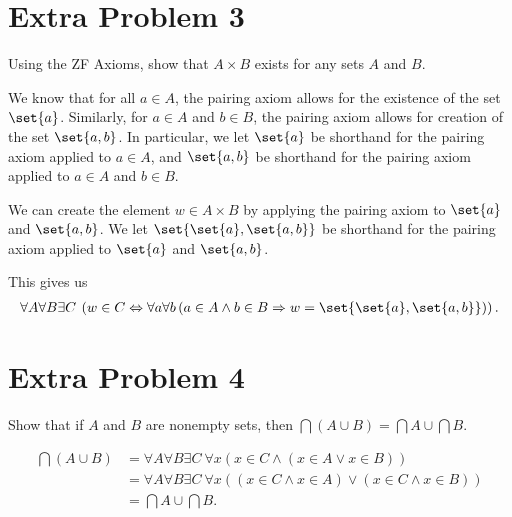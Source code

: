 \documentclass[10pt]{mypackage}
\begin{document}
\section{Extra Problem 3}%
\begin{problem}
  Using the ZF Axioms, show that $A\times B$ exists for any sets $A$ and $B$.
\end{problem}
\begin{solution}
  We know that for all $a\in A$, the pairing axiom allows for the existence of the set $\set{a}$. Similarly, for $a\in A$ and $b\in B$, the pairing axiom allows for creation of the set $\set{a,b}$. In particular, we let $\set{a}$ be shorthand for the pairing axiom applied to $a\in A$, and $\set{a,b}$ be shorthand for the pairing axiom applied to $a\in A$ and $b\in B$.\newline

  We can create the element $w\in A\times B$ by applying the pairing axiom to $\set{a}$ and $\set{a,b}$. We let $\set{\set{a},\set{a,b}}$ be shorthand for the pairing axiom applied to $\set{a}$ and $\set{a,b}$.\newline

  This gives us
  \begin{align*}
    \forall A \forall B \exists C\:\left(w\in C \Leftrightarrow \forall a \forall b\left(a\in A\wedge b\in B \Rightarrow w = \set{\set{a},\set{a,b}}\right)\right).
  \end{align*}
\end{solution}
\section{Extra Problem 4}%
\begin{problem}
  Show that if $A$ and $B$ are nonempty sets, then $\bigcap\left(A\cup B\right) = \bigcap A \cup \bigcap B$.
\end{problem}
\begin{solution}
  \begin{align*}
  \bigcap\left(A\cup B\right) &= \forall A \forall B \exists C \: \forall x\left(x\in C \wedge \left(x\in A \vee x\in B\right)\right)\\
                              &= \forall A\forall B\exists C\: \forall x\left(\left(x\in C \wedge x\in A\right) \vee \left(x\in C \wedge x\in B\right)\right)\\
                              &= \bigcap A \cup \bigcap B.
  \end{align*}
\end{solution}
\end{document}
